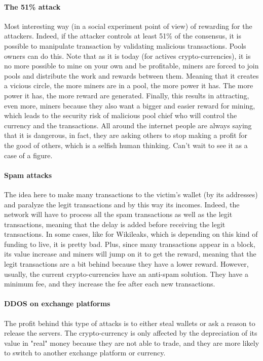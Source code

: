 \paragraph{The 51\% attack}
Most interesting way (in a social experiment point of view) of rewarding for the attackers. Indeed, if the attacker controls at least 51\% of the consensus, it is possible to manipulate transaction by validating malicious transactions. Pools owners can do this. Note that as it is today (for actives crypto-currencies), it is no more possible to mine on your own and be profitable, miners are forced to join pools and distribute the work and rewards between them. Meaning that it creates a vicious circle, the more miners are in a pool, the more power it has. The more power it has, the more reward are generated. Finally, this results in attracting, even more, miners because they also want a bigger and easier reward for mining, which leads to the security risk of malicious pool chief who will control the currency and the transactions. All around the internet people are always saying that it is dangerous, in fact, they are asking others to stop making a profit for the good of others, which is a selfish human thinking. Can't wait to see it as a case of a figure.

\paragraph{Spam attacks}
The idea here to make many transactions to the victim's wallet (by its addresses) and paralyze the legit transactions and by this way its incomes. Indeed, the network will have to process all the spam transactions as well as the legit transactions, meaning that the delay is added before receiving the legit transactions. In some cases, like for Wikileaks\cite{TheBitcoinNews2015BitcoinAttacks}, which is depending on this kind of funding to live, it is pretty bad. Plus, since many transactions appear in a block, its value increase and miners will jump on it to get the reward, meaning that the legit transactions are a bit behind because they have a lower reward. However, usually, the current crypto-currencies have an anti-spam solution. They have a minimum fee, and they increase the fee after each new transactions.

\paragraph{DDOS on exchange platforms}
The profit behind this type of attacks is to either steal wallets or ask a reason to release the servers. The crypto-currency is only affected by the depreciation of its value in "real" money because they are not able to trade, and they are more likely to switch to another exchange platform or currency.

